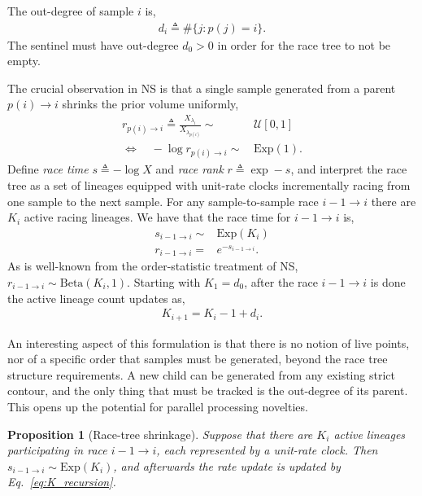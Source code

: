 \documentclass[pdflatex,sn-basic,icol]{sn-jnl}
\newcommand{\Exp}{\mathrm{Exp}}
\theoremstyle{plain}
\newtheorem{proposition}{Proposition}
\theoremstyle{definition}
\begin{document}
The out-degree of sample $i$ is,
\begin{align}
    d_i \triangleq \#\{j:p(j)=i\}.
\end{align}
The sentinel must have out-degree $d_0 > 0$ in order for the race tree to not be empty.

The crucial observation in NS is that a single sample generated from a parent $p(i) \to i$ shrinks the prior volume uniformly,
\begin{align}
    r_{p(i) \to i} \triangleq \frac{X_{\lambda_{i}}}{X_{\lambda_{p(i)}}} \sim&\, \mathcal{U}[0,1]\\
    \Longleftrightarrow\quad -\log r_{p(i) \to i} \sim&\, \mathrm{Exp}(1).
\end{align}
Define \textit{race time} $s \triangleq -\log X$ and \textit{race rank} $r\triangleq \exp -s$, and interpret the race tree as a set of lineages equipped with unit-rate clocks incrementally racing from one sample to the next sample.
For any sample-to-sample race $i-1 \to i$ there are $K_i$ active racing lineages.
We have that the race time for $i-1 \to i$ is,
\begin{align}
    s_{i-1 \to i} \sim& \mathrm{Exp}(K_i)\label{eq:race_increment}\\
    r_{i-1 \to i} =& e^{-s_{i-1 \to i}}.\label{eq:beta_shrinkage}
\end{align}
As is well-known from the order-statistic treatment of NS, $r_{i-1 \to i} \sim \mathrm{Beta}(K_i, 1)$.
Starting with $K_1=d_0$, after the race $i-1\to i$ is done the active lineage count updates as,
\begin{align}
    K_{i+1} = K_i - 1 + d_{i}.\label{eq:K_recursion}
\end{align}

An interesting aspect of this formulation is that there is no notion of live points, nor of a specific order that samples must be generated, beyond the race tree structure requirements.
A new child can be generated from any existing strict contour, and the only thing that must be tracked is the out-degree of its parent.
This opens up the potential for parallel processing novelties.

\begin{proposition}[Race-tree shrinkage]\label{prop:race_tree}
Suppose that there are $K_i$ active lineages participating in race $i-1 \to i$, each represented by a unit-rate clock.
Then $s_{i-1\to i}\sim\Exp(K_i)$, and afterwards the rate update is updated by Eq.~\ref{eq:K_recursion}.
\end{proposition}
\end{document}
